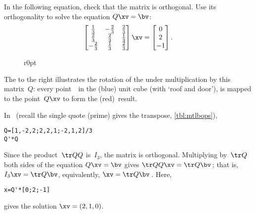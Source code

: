 \begin{example} \label{eg:3dorthog}
In the following equation, check that the matrix is orthogonal. Use its orthogonality to solve the equation \(Q\xv=\bv\):
\begin{equation*}
\begin{bmatrix} \frac13&-\frac23&\frac23
\\\frac23&\frac23&\frac13
\\-\frac23&\frac13&\frac23 \end{bmatrix}\xv
=\begin{bmatrix} 0\\2\\-1 \end{bmatrix}.
\end{equation*} 

\begin{wrapfigure}r{0pt}
\def\unithousesize{footnotesize,height=5.5cm}
\end{wrapfigure}
The  to the right illustrates the rotation of the  under multiplication by this matrix~\(Q\): every point~\xv\ in the (blue) unit cube (with `roof and door'), is mapped to the point~\(Q\xv\) to form the (red)~result.


\begin{solution} In \script\ (recall the single quote (prime) gives the transpose, \cref{tbl:mtlbops}),
\begin{verbatim}
Q=[1,-2,2;2,2,1;-2,1,2]/3
Q'*Q
\end{verbatim}
Since the product~\(\tr QQ\) is~\(I_3\), the matrix is orthogonal.  
Multiplying by~\(\tr Q\) both sides of the equation \(Q\xv=\bv\) gives \(\tr QQ\xv=\tr Q\bv\)\,; that is, \(I_3\xv=\tr Q\bv\), equivalently, \(\xv=\tr Q\bv\)\,.
Here,
\begin{verbatim}
x=Q'*[0;2;-1]
\end{verbatim}
\setbox\ajrqrbox\hbox{}%
\marginajrbox%
gives the solution \(\xv=(2,1,0)\).
\end{solution}
\end{example}


